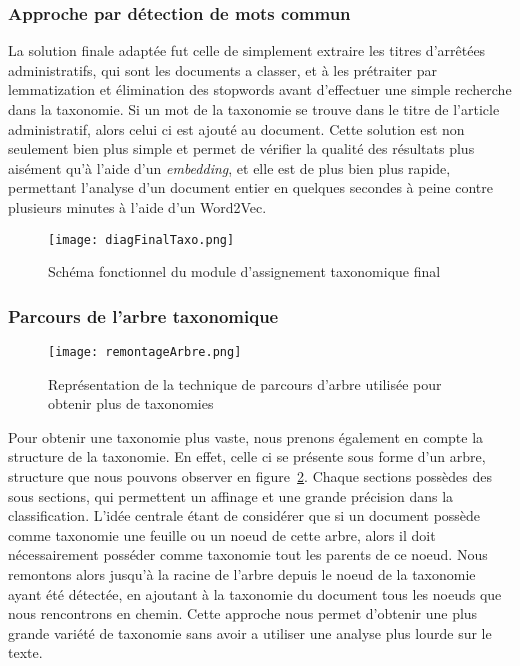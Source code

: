 \subsubsection{Approche par détection de mots commun}
La solution finale adaptée fut celle de simplement extraire les titres d'arrêtées administratifs, qui sont les documents a classer, et à les prétraiter par lemmatization et élimination des stopwords avant d'effectuer une simple recherche dans la taxonomie.
Si un mot de la taxonomie se trouve dans le titre de l'article administratif, alors celui ci est ajouté au document. Cette solution est non seulement bien plus simple et permet de vérifier la qualité des résultats plus aisément qu'à l'aide d'un \textit{embedding}, et elle est de plus bien plus rapide, permettant l'analyse d'un document entier en quelques secondes à peine contre plusieurs minutes à l'aide d'un Word2Vec.

\begin{figure}[h!]
  \centering
  \texttt{[image: diagFinalTaxo.png]}
	\caption[]{Schéma fonctionnel du module d'assignement taxonomique final}
  \label{taxoFinal}
\end{figure}

\subsubsection{Parcours de l'arbre taxonomique}
\begin{figure}[h!]
  \centering
  \texttt{[image: remontageArbre.png]}
	\caption[]{Représentation de la technique de parcours d'arbre utilisée pour obtenir plus de taxonomies}
  \label{fig:tree}
\end{figure}


Pour obtenir une taxonomie plus vaste, nous prenons également en compte la structure de la taxonomie. En effet, celle ci se présente sous forme d'un arbre, structure que nous pouvons observer en figure~\ref{fig:tree}. Chaque sections possèdes des sous sections, qui permettent un affinage et une grande précision dans la classification.
L'idée centrale étant de considérer que si un document possède comme taxonomie une feuille ou un noeud de cette arbre, alors il doit nécessairement posséder comme taxonomie tout les parents de ce noeud. Nous remontons alors jusqu'à la racine de l'arbre depuis le noeud de la taxonomie ayant été détectée, en ajoutant à la taxonomie du document tous les noeuds que nous rencontrons en chemin. Cette approche nous permet d'obtenir une plus grande variété de taxonomie sans avoir a utiliser une analyse plus lourde sur le texte. 

